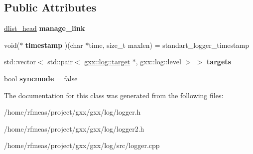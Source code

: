 \subsection*{Public Attributes}
\begin{DoxyCompactItemize}
\item 
\hyperlink{structdlist__head}{dlist\+\_\+head} {\bfseries manage\+\_\+link}\hypertarget{classgxx_1_1log_1_1logger_a6baeb71bcf80c10f491d4f15c8afb52a}{}\label{classgxx_1_1log_1_1logger_a6baeb71bcf80c10f491d4f15c8afb52a}

\item 
void($\ast$ {\bfseries timestamp} )(char $\ast$time, size\+\_\+t maxlen) = standart\+\_\+logger\+\_\+timestamp\hypertarget{classgxx_1_1log_1_1logger_a560395e6de3d87a4efafa5d6bb3ca764}{}\label{classgxx_1_1log_1_1logger_a560395e6de3d87a4efafa5d6bb3ca764}

\item 
std\+::vector$<$ std\+::pair$<$ \hyperlink{classgxx_1_1log_1_1target}{gxx\+::log\+::target} $\ast$, gxx\+::log\+::level $>$ $>$ {\bfseries targets}\hypertarget{classgxx_1_1log_1_1logger_a131a7a5a8eb76c35e0d0cc7b7e4eecca}{}\label{classgxx_1_1log_1_1logger_a131a7a5a8eb76c35e0d0cc7b7e4eecca}

\item 
bool {\bfseries syncmode} = false\hypertarget{classgxx_1_1log_1_1logger_a9fcac8641562a71b737161fdcec524ff}{}\label{classgxx_1_1log_1_1logger_a9fcac8641562a71b737161fdcec524ff}

\end{DoxyCompactItemize}


The documentation for this class was generated from the following files\+:\begin{DoxyCompactItemize}
\item 
/home/rfmeas/project/gxx/gxx/log/logger.\+h\item 
/home/rfmeas/project/gxx/gxx/log/logger2.\+h\item 
/home/rfmeas/project/gxx/gxx/log/src/logger.\+cpp\end{DoxyCompactItemize}
